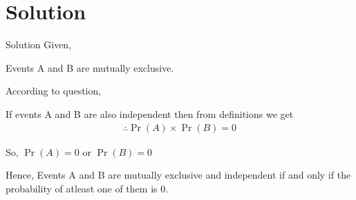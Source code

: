 \documentclass{beamer}
\providecommand{\pr}[1]{\ensuremath{\Pr\left(#1\right)}}
\begin{document}
	
\section{Solution}	
	\begin{frame}{Solution}
		Given,
		
		Events A and B are mutually exclusive.
		
		According to question,
		
		If events A and B are also independent then from definitions we 		get
		\begin{align}
   			 \therefore \pr{A} \times \pr{B} = 0
		\end{align}

So, $\pr{A} = 0$ or $\pr{B} = 0$ 

Hence, Events A and B are mutually exclusive and independent if and only if the probability of atleast one of them is 0.
	\end{frame}

   
\end{document}

